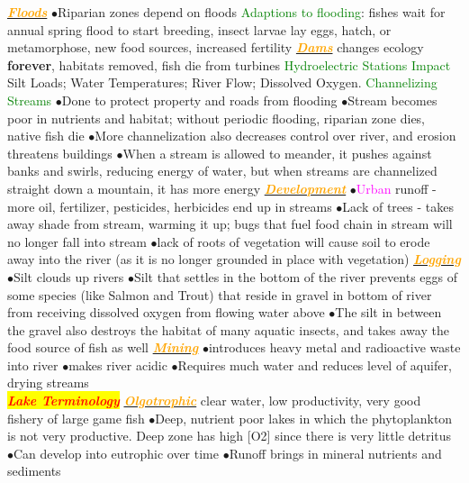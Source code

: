 \documentclass{article}
\newcommand{\ddd}{$\bullet$}
\newcommand{\red}[1]{\textcolor{red}{#1}}
\newcommand{\green}[1]{\textcolor{green}{#1}}
\newcommand{\pink}[1]{\textcolor{magenta}{#1}}
\newcommand{\orange}[1]{\textcolor{orange}{#1}}
\newcommand{\mysection}[1]{\colorbox{yellow}{\textbf{\textit{\red{#1}}}}}
\newcommand{\mysubsection}[1]{\underline{\textbf{{\textit{\orange{#1}}}}}}
\newcommand{\mysubsub}[1]{{{\green{#1}}}}
\newcommand{\vocab}[1]{{\pink{#1}}}
\begin{document}
\begin{multicols*}{4}
        \mysubsection{Floods}
            \ddd Riparian zones depend on floods
            \mysubsub{Adaptions to flooding}: fishes wait for annual spring flood to start breeding, insect larvae lay eggs, hatch, or metamorphose, new food sources, increased fertility
        \mysubsection{Dams}
            changes ecology \textbf{forever}, habitats removed, fish die from turbines
            \mysubsub{Hydroelectric Stations Impact}
                Silt Loads; Water Temperatures; River Flow; Dissolved Oxygen. 
            \mysubsub{Channelizing Streams}
                \ddd Done to protect property and roads from flooding
                \ddd Stream becomes poor in nutrients and habitat; without periodic flooding, riparian zone dies, native fish die
                \ddd More channelization also decreases control over river, and erosion threatens buildings
                \ddd When a stream is allowed to meander, it pushes against banks and swirls, reducing energy of water, but when streams are channelized straight down a mountain, it has more energy
        \mysubsection{Development}
            \ddd \vocab{Urban} runoff - more oil, fertilizer, pesticides, herbicides end up in streams
            \ddd Lack of trees - takes away shade from stream, warming it up; bugs that fuel food chain in stream will no longer fall into stream
            \ddd lack of roots of vegetation will cause soil to erode away into the river (as it is no longer grounded in place with vegetation) 
        \mysubsection{Logging}
            \ddd Silt clouds up rivers
            \ddd Silt that settles in the bottom of the river prevents eggs of some species (like Salmon and Trout) that reside in gravel in bottom of river from receiving dissolved oxygen from flowing water above
            \ddd The silt in between the gravel also destroys the habitat of many aquatic insects, and takes away the food source of fish as well
        \mysubsection{Mining}
            \ddd introduces heavy metal and radioactive waste into river
            \ddd makes river acidic
            \ddd Requires much water and reduces level of aquifer, drying streams
    \\
    \mysection{Lake Terminology}
        \mysubsection{Olgotrophic} clear water, low productivity, very good fishery of large game fish
            \ddd Deep, nutrient poor lakes in which the phytoplankton is not very productive. Deep zone has high [O2] since there is very little detritus
            \ddd Can develop into eutrophic over time
            \ddd Runoff brings in mineral nutrients and sediments

\end{multicols*}
\end{document}
